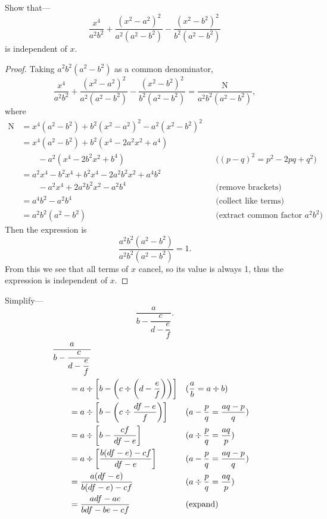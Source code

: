 \documentclass[DIN, pagenumber=false, fontsize=11pt, parskip=half]{scrartcl}
\begin{document}
\begin{problems}[from=1,step=1]
    \problem Show that---
    \[
        \frac{x^4}{a^2b^2} + \frac{(x^2-a^2)^2}{a^2(a^2-b^2)} - \frac{(x^2-b^2)^2}{b^2(a^2-b^2)}
    \]
    is independent of $x$.
    \begin{proof}
        Taking $a^2b^2(a^2-b^2)$ as a common denominator,
        \[
            \frac{x^4}{a^2b^2} + \frac{(x^2-a^2)^2}{a^2(a^2-b^2)} - \frac{(x^2-b^2)^2}{b^2(a^2-b^2)}
                = \frac{\mathrm{N}}{a^2b^2(a^2-b^2)},
        \]
        where
        \begin{align*}
            \mathrm{N} &= x^4(a^2-b^2) + b^2(x^2-a^2)^2 - a^2(x^2-b^2)^2\\ 
                       &= x^4(a^2-b^2) + b^2(x^4-2a^2x^2+a^4)\\ 
                       &\qquad {}- a^2(x^4-2b^2x^2+b^4) && \text{($(p-q)^2 = p^2-2pq+q^2$)}\\ 
                       &= a^2x^4-b^2x^4 + b^2x^4-2a^2b^2x^2+a^4b^2\\ 
                       &\qquad {}- a^2x^4+2a^2b^2x^2-a^2b^4 && \text{(remove brackets)}\\ 
                       &= a^4b^2-a^2b^4 && \text{(collect like terms)}\\ 
                       &= a^2b^2(a^2-b^2) && \text{(extract common factor $a^2b^2$)}
        \end{align*}
        Then the expression is
        \[
            \frac{a^2b^2(a^2-b^2)}{a^2b^2(a^2-b^2)} = 1.
        \]
        From this we see that all terms of $x$ cancel, so its value is always 1, thus the expression is independent of $x$.
    \end{proof}

    \problem Simplify---
    \[
        \frac{a}{b - \dfrac{c}{d - \dfrac{e}{f}}}.
    \]
    \answer 
    \begin{align*}
        \MoveEqLeft
        \frac{a}{b-\dfrac{c}{d-\dfrac{e}{f}}}\\ 
        &= a \div \left[b - \left(c \div \left(d - \dfrac{e}{f}\right)\right)\right] && \text{($\frac{a}{b} = a \div b$)}\\ 
        &= a \div \left[b - \left(c \div \dfrac{df-e}{f}\right)\right] && \text{($a - \frac{p}{q} = \frac{aq-p}{q}$)}\\ 
        &= a \div \left[b - \dfrac{cf}{df-e}\right] && \text{($a \div \frac{p}{q} = \frac{aq}{p}$)}\\ 
        &= a \div \left[\dfrac{b(df-e)-cf}{df-e}\right] && \text{($a - \frac{p}{q} = \frac{aq-p}{q}$)}\\ 
        &= \frac{a(df-e)}{b(df-e)-cf} && \text{($a \div \frac{p}{q} = \frac{aq}{p}$)}\\ 
        &= \frac{adf-ae}{bdf-be-cf} && \text{(expand)}
    \end{align*}


\end{problems}
\end{document}
